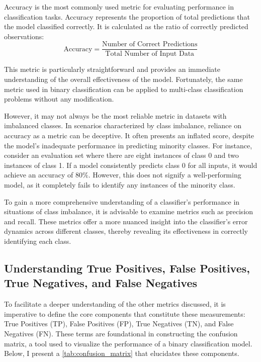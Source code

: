 Accuracy is the most commonly used metric for evaluating performance in classification tasks. Accuracy represents the proportion of total predictions that the model classified correctly. It is calculated as the ratio of correctly predicted observations:
$$
    \text{Accuracy} = \frac{\text{Number of Correct Predictions}}{\text{Total Number of Input Data}}
$$

This metric is particularly straightforward and provides an immediate understanding of the overall effectiveness of the model. Fortunately, the same metric used in binary classification can be applied to multi-class classification problems without any modification.

However, it may not always be the most reliable metric in datasets with imbalanced classes. In scenarios characterized by class imbalance, reliance on accuracy as a metric can be deceptive. It often presents an inflated score, despite the model's inadequate performance in predicting minority classes. For instance, consider an evaluation set where there are eight instances of class 0 and two instances of class 1. If a model consistently predicts class 0 for all inputs, it would achieve an accuracy of $80\%$. However, this does not signify a well-performing model, as it completely fails to identify any instances of the minority class.

To gain a more comprehensive understanding of a classifier's performance in situations of class imbalance, it is advisable to examine metrics such as precision and recall. These metrics offer a more nuanced insight into the classifier's error dynamics across different classes, thereby revealing its effectiveness in correctly identifying each class.

\subsection{Understanding True Positives, False Positives, True Negatives, and False Negatives}

To facilitate a deeper understanding of the other metrics discussed, it is imperative to define the core components that constitute these measurements: True Positives (TP), False Positives (FP), True Negatives (TN), and False Negatives (FN). These terms are foundational in constructing the confusion matrix, a tool used to visualize the performance of a binary classification model. Below, I present a \autoref{tab:confusion_matrix} that elucidates these components.

